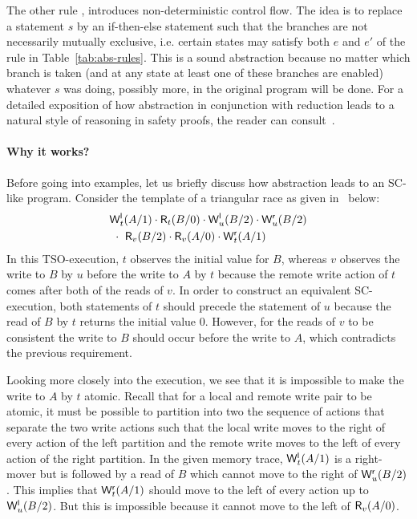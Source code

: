The other rule {}, introduces non-deterministic control flow.
The idea is to replace a statement $s$ by an if-then-else statement such that the branches are not necessarily mutually exclusive, i.e. certain states may satisfy both $e$ and $e'$ of the rule in Table~\ref{tab:abs-rules}.
This is a sound abstraction because no matter which branch is taken (and at any state at least one of these branches are enabled) whatever $s$ was doing, possibly more, in the original program will be done.  
For a detailed exposition of how abstraction in conjunction with reduction leads to a natural style of reasoning in safety proofs, the reader can consult~\cite{EQT2009}.

\paragraph{Why it works?}
Before going into examples, let us briefly discuss how abstraction leads to an SC-like program. 
Consider the template of a triangular race as given in~\cite{Owe2010} below:
\begin{eqnarray*}
&\mathsf{W}^{\mathsf{l}}_{t}(A/1) \cdot \mathsf{R}_{t}(B/0) \cdot \mathsf{W}^{\mathsf{l}}_{u}(B/2) \cdot \mathsf{W}^{\mathsf{r}}_{u}(B/2)\\
&\ \cdot\ \mathsf{R}_{v}(B/2) \cdot \mathsf{R}_{v}(A/0) \cdot \mathsf{W}^{\mathsf{r}}_{t}(A/1)
\end{eqnarray*}
In this TSO-execution, $t$ observes the initial value for $B$, whereas $v$ observes the write to $B$ by $u$ before the write to $A$ by $t$ because the remote write action of $t$ comes after both of the reads of $v$.
In order to construct an equivalent SC-execution, both statements of $t$ should precede the statement of $u$ because the read of $B$ by $t$ returns the initial value 0.
However, for the reads of $v$ to be consistent the write to $B$ should occur before the write to $A$, which contradicts the previous requirement.

Looking more closely into the execution, we see that it is impossible to make the write to $A$ by $t$ atomic. 
Recall that for a local and remote write pair to be atomic, it must be possible to partition into two the sequence of actions that separate the two write actions such that the local write moves to the right of every action of the left partition and the remote write moves to the left of every action of the right partition.
In the given memory trace, $\mathsf{W}^{\mathsf{l}}_{t}(A/1)$ is a right-mover but is followed by a read of $B$ which cannot move to the right of $\mathsf{W}^{\mathsf{r}}_{u}(B/2)$.
This implies that $\mathsf{W}^{\mathsf{r}}_{t}(A/1)$ should move to the left of every action up to $\mathsf{W}^{\mathsf{l}}_{u}(B/2)$.
But this is impossible because it cannot move to the left of $\mathsf{R}_{v}(A/0)$.

